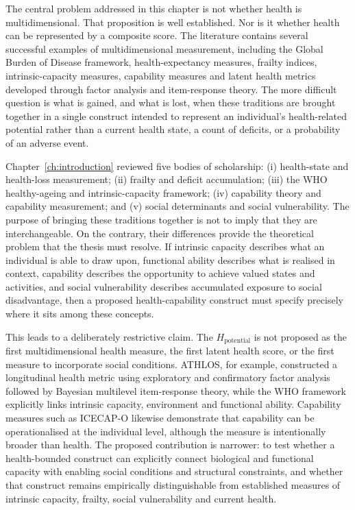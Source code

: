 The central problem addressed in this chapter is not whether health is multidimensional. That proposition is well established. Nor is it whether health can be represented by a composite score. The literature contains several successful examples of multidimensional measurement, including the Global Burden of Disease framework, health-expectancy measures, frailty indices, intrinsic-capacity measures, capability measures and latent health metrics developed through factor analysis and item-response theory. The more difficult question is what is gained, and what is lost, when these traditions are brought together in a single construct intended to represent an individual's health-related potential rather than a current health state, a count of deficits, or a probability of an adverse event.

Chapter~\ref{ch:introduction} reviewed five bodies of scholarship: (i) health-state and health-loss measurement; (ii) frailty and deficit accumulation; (iii) the WHO healthy-ageing and intrinsic-capacity framework; (iv) capability theory and capability measurement; and (v) social determinants and social vulnerability. The purpose of bringing these traditions together is not to imply that they are interchangeable. On the contrary, their differences provide the theoretical problem that the thesis must resolve. If intrinsic capacity describes what an individual is able to draw upon, functional ability describes what is realised in context, capability describes the opportunity to achieve valued states and activities, and social vulnerability describes accumulated exposure to social disadvantage, then a proposed health-capability construct must specify precisely where it sits among these concepts.

This leads to a deliberately restrictive claim. The $H_{\text{potential}}$ is not proposed as the first multidimensional health measure, the first latent health score, or the first measure to incorporate social conditions. ATHLOS, for example, constructed a longitudinal health metric using exploratory and confirmatory factor analysis followed by Bayesian multilevel item-response theory, while the WHO framework explicitly links intrinsic capacity, environment and functional ability. \citep{caballero_athlos_2017,who_2015_ageing,who_healthy_ageing_2026} Capability measures such as ICECAP-O likewise demonstrate that capability can be operationalised at the individual level, although the measure is intentionally broader than health. \citep{icecap_o,icecap_o_validation} The proposed contribution is narrower: to test whether a health-bounded construct can explicitly connect biological and functional capacity with enabling social conditions and structural constraints, and whether that construct remains empirically distinguishable from established measures of intrinsic capacity, frailty, social vulnerability and current health.

